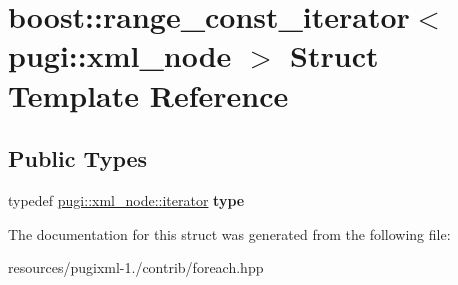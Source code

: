 \hypertarget{structboost_1_1range__const__iterator_3_01pugi_1_1xml__node_01_4}{\section{boost\+:\+:range\+\_\+const\+\_\+iterator$<$ pugi\+:\+:xml\+\_\+node $>$ Struct Template Reference}
\label{structboost_1_1range__const__iterator_3_01pugi_1_1xml__node_01_4}
}
\subsection*{Public Types}
\begin{DoxyCompactItemize}
\item 
\hypertarget{structboost_1_1range__const__iterator_3_01pugi_1_1xml__node_01_4_a15c23e25e1dc892eb0e2f6ad261c6c2d}{typedef \hyperlink{classpugi_1_1xml__node__iterator}{pugi\+::xml\+\_\+node\+::iterator} {\bfseries type}}\label{structboost_1_1range__const__iterator_3_01pugi_1_1xml__node_01_4_a15c23e25e1dc892eb0e2f6ad261c6c2d}

\end{DoxyCompactItemize}


The documentation for this struct was generated from the following file\+:\begin{DoxyCompactItemize}
\item 
resources/pugixml-\/1./contrib/foreach.\+hpp\end{DoxyCompactItemize}
